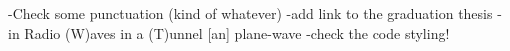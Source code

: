 -Check some punctuation (kind of whatever)
-add link to the graduation thesis
-in Radio (W)aves in a (T)unnel [an] plane-wave
-check the code styling!
